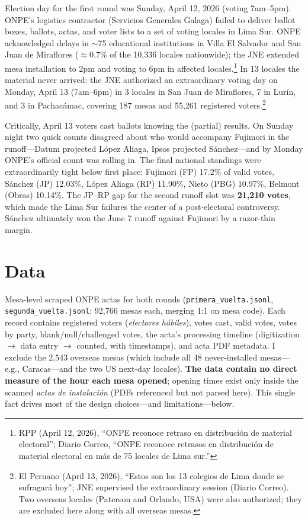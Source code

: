 \documentclass[11pt]{article}
\begin{document}
Election day for the first round was Sunday, April 12, 2026 (voting 7am--5pm). ONPE's logistics contractor (Servicios Generales Galaga) failed to deliver ballot boxes, ballots, actas, and voter lists to a set of voting locales in Lima Sur. ONPE acknowledged delays in $\sim$75 educational institutions in Villa El Salvador and San Juan de Miraflores ($\approx$0.7\% of the 10,336 locales nationwide); the JNE extended mesa installation to 2pm and voting to 6pm in affected locales.\footnote{RPP (April 12, 2026), ``ONPE reconoce retraso en distribución de material electoral''; Diario Correo, ``ONPE reconoce retrasos en distribución de material electoral en más de 75 locales de Lima sur.''} In 13 locales the material never arrived: the JNE authorized an extraordinary voting day on Monday, April 13 (7am--6pm) in 3 locales in San Juan de Miraflores, 7 in Lurín, and 3 in Pachacámac, covering 187 mesas and 55,261 registered voters.\footnote{El Peruano (April 13, 2026), ``Estos son los 13 colegios de Lima donde se sufragará hoy''; JNE supervised the extraordinary session (Diario Correo). Two overseas locales (Paterson and Orlando, USA) were also authorized; they are excluded here along with all overseas mesas.}

Critically, April 13 voters cast ballots knowing the (partial) results. On Sunday night two quick counts disagreed about who would accompany Fujimori in the runoff---Datum projected L\'opez Aliaga, Ipsos projected S\'anchez---and by Monday ONPE's official count was rolling in. The final national standings were extraordinarily tight below first place: Fujimori (FP) 17.2\% of valid votes, S\'anchez (JP) 12.03\%, L\'opez Aliaga (RP) 11.90\%, Nieto (PBG) 10.97\%, Belmont (Obras) 10.14\%. The JP--RP gap for the second runoff slot was \textbf{21,210 votes}, which made the Lima Sur failures the center of a post-electoral controversy. S\'anchez ultimately won the June 7 runoff against Fujimori by a razor-thin margin.

\section{Data}

Mesa-level scraped ONPE actas for both rounds (\texttt{primera\_vuelta.jsonl}, \texttt{segunda\_vuelta.jsonl}; 92,766 mesas each, merging 1:1 on mesa code). Each record contains registered voters (\emph{electores hábiles}), votes cast, valid votes, votes by party, blank/null/challenged votes, the acta's processing timeline (digitization $\rightarrow$ data entry $\rightarrow$ counted, with timestamps), and acta PDF metadata. I exclude the 2,543 overseas mesas (which include all 48 never-installed mesas---e.g., Caracas---and the two US next-day locales). \textbf{The data contain no direct measure of the hour each mesa opened}; opening times exist only inside the scanned \emph{actas de instalación} (PDFs referenced but not parsed here). This single fact drives most of the design choices---and limitations---below.
\end{document}
